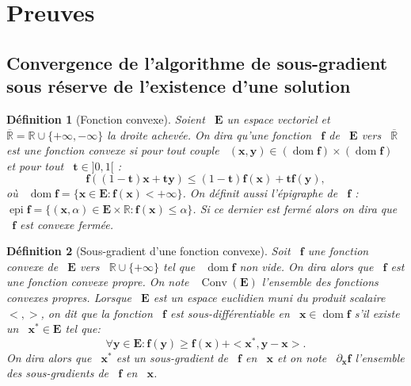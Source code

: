 \documentclass[publibook-draft]{CAp2012}
\newtheorem{definition}{Définition}
\newcommand{\dom}{\operatorname*{dom}}
\newcommand{\epi}{\operatorname{epi}}
\newcommand{\conv}{\operatorname*{Conv}}
\newcommand{\af}{\mathbf{f}}
\newcommand{\bt}{\mathbf{t}}
\newcommand{\bx}{\mathbf{x}}
\newcommand{\by}{\mathbf{y}}
\newcommand{\me}{\mathbf{E}}
\begin{document}
\section{Preuves}\label{proof.sec}
\subsection{Convergence de l'algorithme de sous-gradient sous réserve de l'existence d'une solution}
\begin{definition}[Fonction convexe]
Soient ~$\me$ un espace vectoriel et ~$\overline{\mathbb{R}}=\mathbb{R}\cup\{+\infty,-\infty\}$ la droite achevée. On dira qu'une fonction ~$\af$ de ~$\me$ vers ~$\overline{\mathbb{R}}$ est une fonction convexe si pour tout couple ~$(\bx,\by)\in(\dom\af)\times(\dom\af)$ et pour tout ~$\bt\in]0,1[$ :
\begin{equation}
\af((1-\bt)\bx+\bt\by)\leq(1-\bt)\af(\bx)+\bt\af(\by),
\end{equation}
où ~$\dom\af=\{\bx\in\me:\af(\bx)<+\infty\}$.
On définit aussi l'épigraphe de ~$\af$ : ~$\epi \af=\{(\bx,\alpha)\in\me\times\mathbb{R}:\af(\bx)\leq\alpha\}$. Si ce dernier est fermé alors on dira que ~$\af$ est convexe fermée.
\end{definition}
\begin{definition}[Sous-gradient d'une fonction convexe]
Soit ~$\af$ une fonction convexe de ~$\me$ vers ~$\mathbb{R}\cup\{+\infty\}$ tel que ~$\dom\af$ non vide. On dira alors que ~$\af$ est une fonction convexe propre. On note ~$\conv(\me)$ l'ensemble des fonctions convexes propres. Lorsque ~$\me$ est un espace euclidien muni du produit scalaire $<,>$, on dit que la fonction ~$\af$ est sous-différentiable en ~$\bx\in\dom\af$ s'il existe un ~$\bx^*\in\me$ tel que:
\begin{equation}
\forall \by\in\me : \af(\by)\geq\af(\bx)+<\bx^*,\by-\bx>.
\end{equation}
On dira alors que ~$\bx^*$ est un sous-gradient de ~$\af$ en ~$\bx$ et on note ~$\partial_\bx\af$ l'ensemble des sous-gradients de ~$\af$ en ~$\bx$.
\end{definition}
\end{document}
